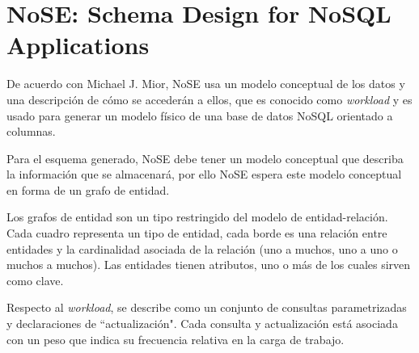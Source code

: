 \section{NoSE: Schema Design for NoSQL Applications}
De acuerdo con Michael J. Mior\cite{mior_nose_2017}, NoSE usa un modelo conceptual de los datos y una descripción de cómo se accederán a ellos, que es conocido como \textit{workload} y es usado para generar un modelo físico de una base de datos NoSQL orientado a columnas.


Para el esquema generado, NoSE debe tener un modelo conceptual que describa la información que se almacenará, por ello NoSE espera este modelo conceptual en forma de un grafo de entidad.


Los grafos de entidad son un tipo restringido del modelo de entidad-relación. Cada cuadro representa un tipo de entidad, cada borde es una relación entre entidades y la cardinalidad asociada de la relación (uno a muchos, uno a uno o muchos a muchos). Las entidades tienen atributos, uno o más de los cuales sirven como clave. 


Respecto al \textit{workload}, se describe como un conjunto de consultas parametrizadas y declaraciones de ``actualización". Cada consulta y actualización está asociada con un peso que indica su frecuencia relativa en la carga de trabajo.